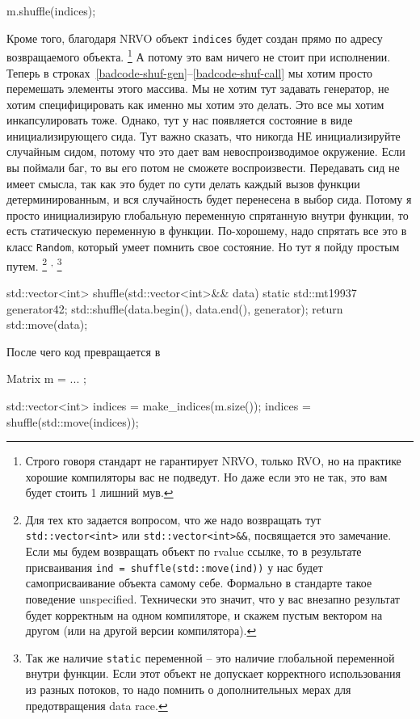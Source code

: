 \begin{enumerate}
\begin{cppcode}
m.shuffle(indices);
\end{cppcode}
Кроме того, благодаря NRVO объект \verb"indices" будет создан прямо по адресу возвращаемого объекта.%
\footnote{Строго говоря стандарт не гарантирует NRVO, только RVO, но на практике хорошие компиляторы вас не подведут.
Но даже если это не так, это вам будет стоить 1 лишний мув.}
А потому это вам ничего не стоит при исполнении.
Теперь в строках~\ref{badcode-shuf-gen}--\ref{badcode-shuf-call} мы хотим просто перемешать элементы этого массива.
Мы не хотим тут задавать генератор, не хотим специфицировать как именно мы хотим это делать.
Это все мы хотим инкапсулировать тоже.
Однако, тут у нас появляется состояние в виде инициализирующего сида.
Тут важно сказать, что никогда НЕ инициализируйте случайным сидом, потому что это дает вам невоспроизводимое окружение.
Если вы поймали баг, то вы его потом не сможете воспроизвести.
Передавать сид не имеет смысла, так как это будет по сути делать каждый вызов функции детерминированным, и вся случайность будет перенесена в выбор сида.
Потому я просто инициализирую глобальную переменную спрятанную внутри функции, то есть статическую переменную в функции.
По-хорошему, надо спрятать все это в класс \verb"Random", который умеет помнить свое состояние.
Но тут я пойду простым путем.%
\footnote{Для тех кто задается вопросом, что же надо возвращать тут \texttt{std::vector<int>} или \texttt{std::vector<int>\&\&}, посвящается это замечание.
Если мы будем возвращать объект по rvalue ссылке, то в результате присваивания \texttt{ind = shuffle(std::move(ind))} у нас будет самоприсваивание объекта самому себе.
Формально в стандарте такое поведение unspecified.
Технически это значит, что у вас внезапно результат будет корректным на одном компиляторе, и скажем пустым вектором на другом (или на другой версии компилятора).}%
\textsuperscript{,}%
\footnote{Так же наличие \texttt{static} переменной -- это наличие глобальной переменной внутри функции.
Если этот объект не допускает корректного использования из разных потоков, то надо помнить о дополнительных мерах для предотвращения data race.}
\begin{cppcode}
std::vector<int> shuffle(std::vector<int>&& data) {
  static std::mt19937 generator{42};
  std::shuffle(data.begin(), data.end(), generator);
  return std::move(data);
}
\end{cppcode}
После чего код превращается в
\begin{cppcode}
Matrix m = ... ;

std::vector<int> indices  = make_indices(m.size());
indices = shuffle(std::move(indices));


\end{cppcode}
\end{enumerate}
